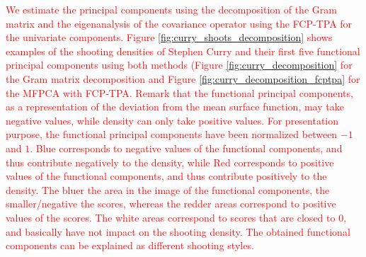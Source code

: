 \textcolor{red}{We estimate the principal components using the decomposition of the Gram matrix and the eigenanalysis of the covariance operator using the FCP-TPA for the univariate components. Figure \ref{fig:curry_shoots_decomposition} shows examples of the shooting densities of Stephen Curry and their first five functional principal components using both methods (Figure \ref{fig:curry_decomposition} for the Gram matrix decomposition and Figure \ref{fig:curry_decomposition_fcptpa} for the MFPCA with FCP-TPA. Remark that the functional principal components, as a representation of the deviation from the mean surface function, may take negative values, while density can only take positive values. For presentation purpose, the functional principal components have been normalized between $-1$ and $1$. Blue corresponds to negative values of the functional components, and thus contribute negatively to the density, while Red corresponds to positive values of the functional components, and thus contribute positively to the density. The bluer the area in the image of the functional components, the smaller/negative the scores, whereas the redder areas correspond to positive values of the scores. The white areas correspond to scores that are closed to $0$, and basically have not impact on the shooting density. The obtained functional components can be explained as different shooting styles.}
